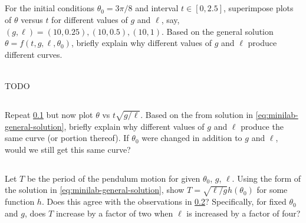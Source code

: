 \documentclass[12pt]{article}
\begin{document}
\subsection{}
\label{sec:minilab-part-1}
\begin{Ex}
  For the initial conditions $\theta_0=3\pi/8$ and interval $t\in[0,2.5]$,
  superimpose plots of $\theta$ versus $t$ for different values of $g$ and $\ell$,
  say, $(g,\ell)=(10, 0.25), (10, 0.5), (10, 1)$. Based on the general solution
  $\theta = f(t,g,\ell,\theta_0)$, briefly explain why different values of $g$ and
  $\ell$ produce different curves.
  \begin{solution} \hfill \vspace{.75em} \\
    {\huge \color{red}TODO}
  \end{solution}
\end{Ex}

\subsection{}
\label{sec:minilab-part-2}
Repeat \cref{sec:minilab-part-1} but now plot $\theta$ vs $t\sqrt{g/\ell}$.
Based on the from solution in \cref{eq:minilab-general-solution}, briefly
explain why different values of $g$ and $\ell$ produce the same curve (or
portion thereof). If $\theta_0$ were changed in addition to $g$ and $\ell$,
would we still get this same curve?

\subsection{}
Let $T$ be the period of the pendulum motion for given $\theta_0$, $g$, $\ell$.
Using the form of the solution in \cref{eq:minilab-general-solution}, show
$T=\sqrt{\ell/g}h(\theta_0)$ for some function $h$. Does this agree with the
observations in \cref{sec:minilab-part-2}? Specifically, for fixed $\theta_0$
and $g$, does $T$ increase by a factor of two when $\ell$ is increased by a
factor of four?
\end{document}
